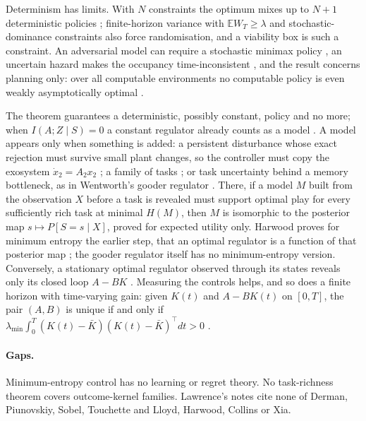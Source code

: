 \documentclass[10pt]{article}
\begin{document}
Determinism has limits. With $N$ constraints the optimum mixes up to $N+1$ deterministic policies \citep{Piunovskiy-controlled98}; finite-horizon variance with $\mathbb{E}W_T\ge\lambda$ \citep{Mannor-algorithmic13} and stochastic-dominance constraints \citep{Haskell-stochastic13} also force randomisation, and a viability box is such a constraint. An adversarial model can require a stochastic minimax policy \citep{Androulakis-generalised14}, an uncertain hazard makes the occupancy time-inconsistent \citep{Fedus-hyperbolic19}, and the result concerns planning only: over all computable environments no computable policy is even weakly asymptotically optimal \citep[Thm.~8]{Lattimore-asymptotically11}.

The theorem guarantees a deterministic, possibly constant, policy and no more; when $I(A;Z\mid S)=0$ a constant regulator already counts as a model \citep{Thobani-triviality24}. A model appears only when something is added: a persistent disturbance whose exact rejection must survive small plant changes, so the controller must copy the exosystem $\dot x_2=A_2x_2$ \citep{Francis-internal76}; a family of tasks \citep{Richens-general25}; or task uncertainty behind a memory bottleneck, as in Wentworth's gooder regulator \citep{Wentworth-fixing21}. There, if a model $M$ built from the observation $X$ before a task is revealed must support optimal play for every sufficiently rich task at minimal $H(M)$, then $M$ is isomorphic to the posterior map $s\mapsto P[S=s\mid X]$, proved for expected utility only. Harwood proves for minimum entropy the earlier step, that an optimal regulator is a function of that posterior map \citep{Harwood-generalization25}; the gooder regulator itself has no minimum-entropy version. Conversely, a stationary optimal regulator observed through its states reveals only its closed loop $A-BK$ \citep{Geadah-inferring24}. Measuring the controls helps, and so does a finite horizon with time-varying gain: given $K(t)$ and $A-BK(t)$ on $[0,T]$, the pair $(A,B)$ is unique if and only if $\lambda_{\min}\int_0^T (K(t)-\bar K)(K(t)-\bar K)^\top dt>0$ \citep{Yu-joint26}.

\paragraph{Gaps.}
Minimum-entropy control has no learning or regret theory. No task-richness theorem covers outcome-kernel families. Lawrence's notes cite none of Derman, Piunovskiy, Sobel, Touchette and Lloyd, Harwood, Collins or Xia.
\end{document}
